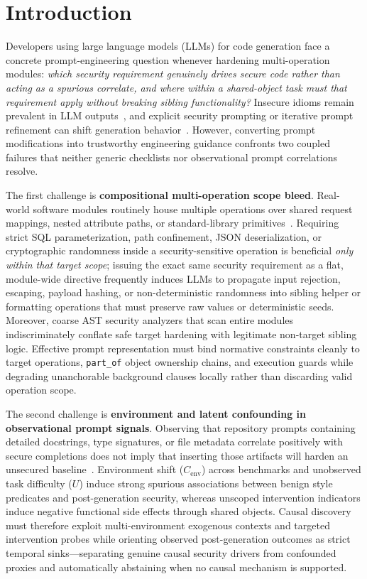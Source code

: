 \section{Introduction}

Developers using large language models (LLMs) for code generation face a
concrete prompt-engineering question whenever hardening multi-operation modules:
\emph{which security requirement genuinely drives secure code rather than acting
as a spurious correlate, and where within a shared-object task must that
requirement apply without breaking sibling functionality?} Insecure idioms
remain prevalent in LLM outputs~\cite{pearce2022copilot,perry2023assistants},
and explicit security prompting or iterative prompt refinement can shift
generation behavior~\cite{tony2025prompting,nazzal2024promsec}. However,
converting prompt modifications into trustworthy engineering guidance confronts
two coupled failures that neither generic checklists nor observational prompt
correlations resolve.

The first challenge is \textbf{compositional multi-operation scope bleed}.
Real-world software modules routinely house multiple operations over shared
request mappings, nested attribute paths, or standard-library
primitives~\cite{cicalese2026language}. Requiring strict SQL parameterization,
path confinement, JSON deserialization, or cryptographic randomness inside a
security-sensitive operation is beneficial \emph{only within that target scope};
issuing the exact same security requirement as a flat, module-wide directive
frequently induces LLMs to propagate input rejection, escaping, payload hashing,
or non-deterministic randomness into sibling helper or formatting operations that
must preserve raw values or deterministic seeds. Moreover, coarse AST security
analyzers that scan entire modules indiscriminately conflate safe target
hardening with legitimate non-target sibling logic. Effective prompt
representation must bind normative constraints cleanly to target operations,
\texttt{part\_of} object ownership chains, and execution guards while
degrading unanchorable background clauses locally rather than discarding valid
operation scope.

The second challenge is \textbf{environment and latent confounding in
observational prompt signals}. Observing that repository prompts containing
detailed docstrings, type signatures, or file metadata correlate positively with
secure completions does not imply that inserting those artifacts will harden an
unsecured baseline~\cite{ji2025causality,velasco2026smells}. Environment shift
($C_{\mathrm{env}}$) across benchmarks and unobserved task difficulty ($U$)
induce strong spurious associations between benign style predicates and
post-generation security, whereas unscoped intervention indicators induce
negative functional side effects through shared objects. Causal discovery must
therefore exploit multi-environment exogenous contexts and targeted
intervention probes while orienting observed post-generation outcomes as strict
temporal sinks---separating genuine causal security drivers from confounded
proxies and automatically abstaining when no causal mechanism is supported.

